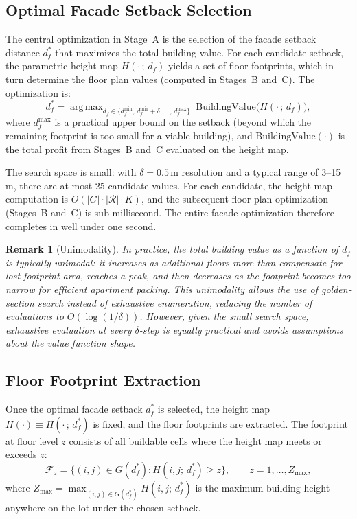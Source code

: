 \documentclass[11pt,a4paper]{article}
\newtheorem{remark}{Remark}
\DeclareMathOperator*{\argmax}{arg\,max}
\newcommand{\calF}{\mathcal{F}}
\newcommand{\calR}{\mathcal{R}}
\begin{document}
\subsection{Optimal Facade Setback Selection}\label{sec:facade-opt}

The central optimization in Stage~A is the selection of the facade
setback distance $d_f^*$ that maximizes the total building value. For
each candidate setback, the parametric height map $H(\cdot\,;\,d_f)$
yields a set of floor footprints, which in turn determine the floor
plan values (computed in Stages~B and~C). The optimization is:
\begin{equation}\label{eq:facade-opt}
    d_f^* = \argmax_{d_f \in \{d_f^{\min},\, d_f^{\min} + \delta,\, \ldots,\, d_f^{\max}\}} \; \text{BuildingValue}\bigl(H(\cdot\,;\,d_f)\bigr),
\end{equation}
where $d_f^{\max}$ is a practical upper bound on the setback (beyond
which the remaining footprint is too small for a viable building), and
$\text{BuildingValue}(\cdot)$ is the total profit from Stages~B and~C
evaluated on the height map.

The search space is small: with $\delta = 0.5$\,m resolution and a
typical range of 3--15\,m, there are at most 25 candidate values. For
each candidate, the height map computation is $O(|G| \cdot |\calR|
\cdot K)$, and the subsequent floor plan optimization (Stages~B and~C)
is sub-millisecond. The entire facade optimization therefore completes
in well under one second.

\begin{remark}[Unimodality]
In practice, the total building value as a function of $d_f$ is
typically unimodal: it increases as additional floors more than
compensate for lost footprint area, reaches a peak, and then decreases
as the footprint becomes too narrow for efficient apartment packing.
This unimodality allows the use of golden-section search instead of
exhaustive enumeration, reducing the number of evaluations to
$O(\log(1/\delta))$. However, given the small search space, exhaustive
evaluation at every $\delta$-step is equally practical and avoids
assumptions about the value function shape.
\end{remark}

\subsection{Floor Footprint Extraction}

Once the optimal facade setback $d_f^*$ is selected, the height map
$H(\cdot) \equiv H(\cdot\,;\,d_f^*)$ is fixed, and the floor footprints
are extracted. The footprint at floor level $z$ consists of all
buildable cells where the height map meets or exceeds $z$:
\begin{equation}\label{eq:footprint}
    \calF_z = \bigl\{(i,j) \in G(d_f^*) : H(i,j;\,d_f^*) \geq z\bigr\}, \qquad z = 1, \ldots, Z_{\max},
\end{equation}
where $Z_{\max} = \max_{(i,j) \in G(d_f^*)} H(i,j;\,d_f^*)$ is the
maximum building height anywhere on the lot under the chosen setback.
\end{document}
